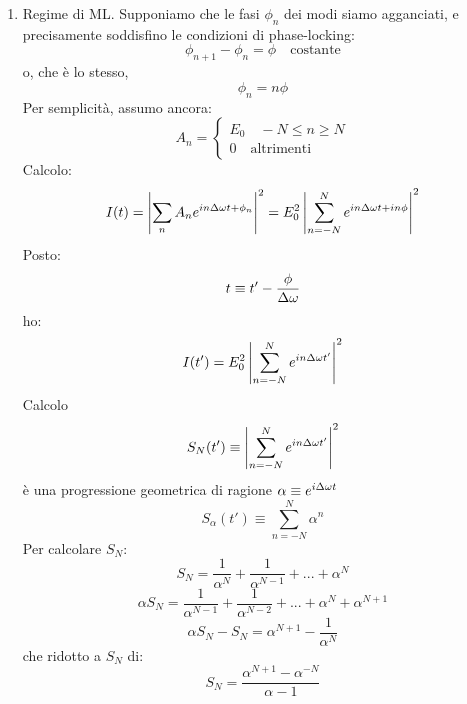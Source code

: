 \begin{enumerate}
\item Regime di ML. Supponiamo che le fasi $\phi_n$ dei modi siamo agganciati, e precisamente soddisfino le condizioni di phase-locking:
\begin{equation*}
\phi_{n+1} - \phi_n = \phi \quad \text{costante}
\end{equation*}
o, che è lo stesso,
\begin{equation*}
\phi_n = n\phi
\end{equation*}
Per semplicità, assumo ancora:
\begin{equation*}
A_n = \begin{cases}
E_0 \quad -N\leq n \geq N\\
0 \quad \text{altrimenti}
\end{cases}
\end{equation*}
Calcolo:
\begin{equation*}
I(t) = \left| \sum_n A_n e^{in\Delta\omega t + \phi_n} \right|^2 = E_0^2 \left| \sum_{n=-N}^N e^{in\Delta\omega t + i n\phi} \right|^2
\end{equation*}
Posto:
\begin{equation*}
t \equiv t'-\frac{\phi}{\Delta\omega}
\end{equation*}
ho:
\begin{equation*}
I(t') = E_0^2 \left| \sum_{n=-N}^N e^{in\Delta\omega t'} \right|^2
\end{equation*}
Calcolo
\begin{equation*}
S_N(t') \equiv \left| \sum_{n=-N}^N e^{in\Delta\omega t'} \right|^2
\end{equation*}
è una progressione geometrica di ragione $\alpha \equiv e^{i\Delta\omega t}$
\begin{equation*}
S_\alpha(t') \equiv \sum_{n=-N}^N \alpha^n
\end{equation*}
Per calcolare $S_N$:
\begin{equation*}
S_N = \frac{1}{\alpha^N} + \frac{1}{\alpha^{N-1}} + ... +\alpha^N
\end{equation*}
\begin{equation*}
\alpha S_N = \frac{1}{\alpha^{N-1}} + \frac{1}{\alpha^{N-2}} + ... + \alpha^N + \alpha^{N+1}
\end{equation*}
\begin{equation*}
\alpha S_N - S_N = \alpha^{N+1} - \frac{1}{\alpha^N}
\end{equation*}
che ridotto a $S_N$ di:
\begin{equation*}
S_N = \frac{\alpha^{N+1} - \alpha^{-N}}{\alpha - 1}
\end{equation*}

\end{enumerate}
